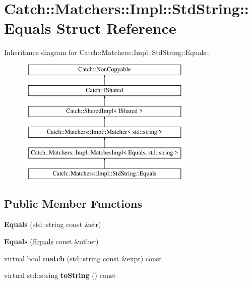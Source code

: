 \hypertarget{structCatch_1_1Matchers_1_1Impl_1_1StdString_1_1Equals}{
\section{Catch::Matchers::Impl::StdString::Equals Struct Reference}
\label{structCatch_1_1Matchers_1_1Impl_1_1StdString_1_1Equals}
}
Inheritance diagram for Catch::Matchers::Impl::StdString::Equals::\begin{figure}[H]
\begin{center}
\leavevmode
\includegraphics[height=6cm]{structCatch_1_1Matchers_1_1Impl_1_1StdString_1_1Equals}
\end{center}
\end{figure}
\subsection*{Public Member Functions}
\begin{DoxyCompactItemize}
\item 
\hypertarget{structCatch_1_1Matchers_1_1Impl_1_1StdString_1_1Equals_a1bd99b381c6116a02b1e3ca200ca920c}{
{\bfseries Equals} (std::string const \&str)}
\label{structCatch_1_1Matchers_1_1Impl_1_1StdString_1_1Equals_a1bd99b381c6116a02b1e3ca200ca920c}

\item 
\hypertarget{structCatch_1_1Matchers_1_1Impl_1_1StdString_1_1Equals_acaa97de06aedf363ae803d65a975f5e4}{
{\bfseries Equals} (\hyperlink{structCatch_1_1Matchers_1_1Impl_1_1StdString_1_1Equals}{Equals} const \&other)}
\label{structCatch_1_1Matchers_1_1Impl_1_1StdString_1_1Equals_acaa97de06aedf363ae803d65a975f5e4}

\item 
\hypertarget{structCatch_1_1Matchers_1_1Impl_1_1StdString_1_1Equals_a00c8259a76c24da669e116662ededc70}{
virtual bool {\bfseries match} (std::string const \&expr) const }
\label{structCatch_1_1Matchers_1_1Impl_1_1StdString_1_1Equals_a00c8259a76c24da669e116662ededc70}

\item 
\hypertarget{structCatch_1_1Matchers_1_1Impl_1_1StdString_1_1Equals_a7a09449ff2f858981caf3b1f6c36d270}{
virtual std::string {\bfseries toString} () const }
\label{structCatch_1_1Matchers_1_1Impl_1_1StdString_1_1Equals_a7a09449ff2f858981caf3b1f6c36d270}

\end{DoxyCompactItemize}
